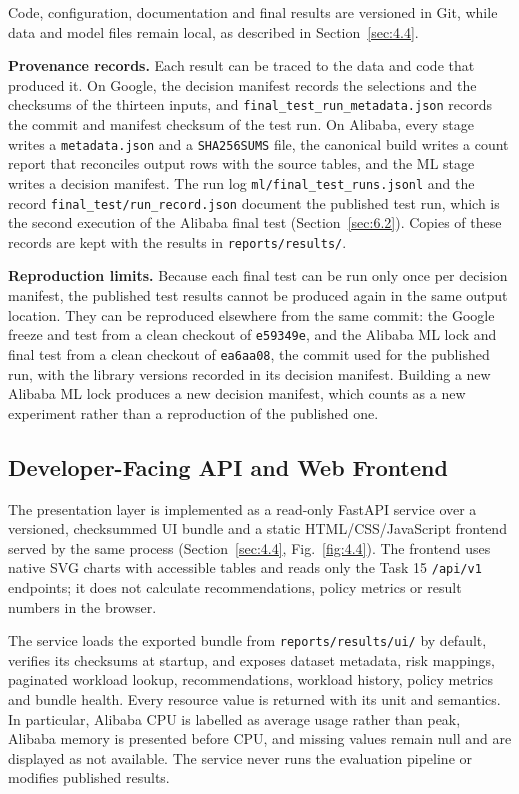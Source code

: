 \documentclass{IEEEtran}
\begin{document}
Code, configuration, documentation and final results are versioned in Git, while data and model files remain local, as described in Section~\ref{sec:4.4}.

\textbf{Provenance records.} Each result can be traced to the data and code that produced it. On Google, the decision manifest records the selections and the checksums of the thirteen inputs, and \texttt{final\_test\_run\_metadata.json} records the commit and manifest checksum of the test run. On Alibaba, every stage writes a \texttt{metadata.json} and a \texttt{SHA256SUMS} file, the canonical build writes a count report that reconciles output rows with the source tables, and the ML stage writes a decision manifest. The run log \texttt{ml/final\_test\_runs.jsonl} and the record \texttt{final\_test/run\_record.json} document the published test run, which is the second execution of the Alibaba final test (Section~\ref{sec:6.2}). Copies of these records are kept with the results in \texttt{reports/results/}.

\textbf{Reproduction limits.} Because each final test can be run only once per decision manifest, the published test results cannot be produced again in the same output location. They can be reproduced elsewhere from the same commit: the Google freeze and test from a clean checkout of \texttt{e59349e}, and the Alibaba ML lock and final test from a clean checkout of \texttt{ea6aa08}, the commit used for the published run, with the library versions recorded in its decision manifest. Building a new Alibaba ML lock produces a new decision manifest, which counts as a new experiment rather than a reproduction of the published one.

\subsection{Developer-Facing API and Web Frontend}\label{sec:8.3}

The presentation layer is implemented as a read-only FastAPI service over a versioned, checksummed UI bundle and a static HTML/CSS/JavaScript frontend served by the same process (Section~\ref{sec:4.4}, Fig.~\ref{fig:4.4}). The frontend uses native SVG charts with accessible tables and reads only the Task 15 \texttt{/api/v1} endpoints; it does not calculate recommendations, policy metrics or result numbers in the browser.

The service loads the exported bundle from \texttt{reports/results/ui/} by default, verifies its checksums at startup, and exposes dataset metadata, risk mappings, paginated workload lookup, recommendations, workload history, policy metrics and bundle health. Every resource value is returned with its unit and semantics. In particular, Alibaba CPU is labelled as average usage rather than peak, Alibaba memory is presented before CPU, and missing values remain null and are displayed as not available. The service never runs the evaluation pipeline or modifies published results.
\end{document}
